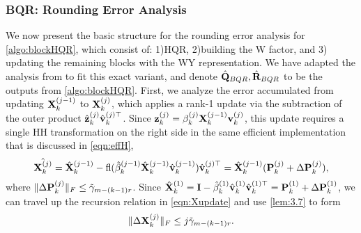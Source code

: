 \subsubsection{BQR: Rounding Error Analysis}\label{sec:BQRerr}
We now present the basic structure for the rounding error analysis for \cref{algo:blockHQR}, which consist of: 1)HQR, 2)building the W factor, and 3) updating the remaining blocks with the WY representation.
We have adapted the analysis from \cite{Higham2002} to fit this exact variant, and denote $\hat{\mathbf{Q}}_{BQR},\hat{\mathbf{R}}_{BQR}$ to be the outputs from \cref{algo:blockHQR}.
First, we analyze the error accumulated from updating $\mathbf{X}_k^{(j-1)}$ to $\mathbf{X}_k^{(j)}$, which applies a rank-1 update via the subtraction of the outer product $\hat{\mathbf{z}}_{k}^{(j)}\hat{\mathbf{v}}_{k}^{(j)\top}$.
Since $\mathbf{z}_{k}^{(j)} = \beta_k^{(j)}\mathbf{X}_{k}^{(j-1)}\mathbf{v}_{k}^{(j)}$, this update requires a single HH transformation on the right side in the same efficient implementation that is discussed in \cref{eqn:effH},
\begin{equation}
\hat{\bb{X}_k^{(j)}} = 
\hat{\bb{X}}_k^{(j-1)} - \fl(\hat{\beta}_k^{(j-1)}\hat{\bb{X}}_k^{(j-1)}\hat{\bb{v}}_k^{(j-1)})\hat{\bb{v}}_k^{(j)\top} = \hat{\bb{X}}_k^{(j-1)}(\bb{P}_k^{(j)}+\Delta \bb{P}_k^{(j)}), \label{eqn:Xupdate}
\end{equation}
where $\|\Delta \mathbf{P}_k^{(j)}\|_F \leq \tilde{\gamma}_{m-(k-1)r}$.
Since $\hat{\mathbf{X}}_k^{(1)} = \mathbf{I} - \hat{\beta}_k^{(1)}\hat{\mathbf{v}}_k^{(1)}\hat{\mathbf{v}}_k^{(1)\top} = \mathbf{P}_k^{(1)} + \Delta \mathbf{P}_k^{(1)}$, we can travel up the recursion relation in \cref{eqn:Xupdate} and use \cref{lem:3.7} to form
\begin{equation}
	\|\Delta \bb{X}_k^{(j)} \|_F \leq j\tilde{\gamma}_{m-(k-1)r}. \label{eqn:deltX}
\end{equation}

